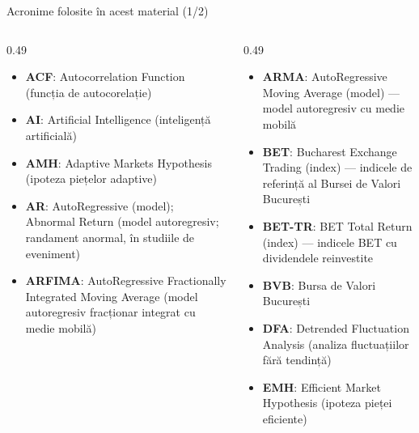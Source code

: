 \begin{frame}{Acronime folosite în acest material (1/2)}
\begin{columns}[T]
\begin{column}{0.49\textwidth}
\begin{itemize}\setlength{\itemsep}{0pt}
    \item \textbf{ACF}: Autocorrelation Function (funcția de autocorelație)
    \item \textbf{AI}: Artificial Intelligence (inteligență artificială)
    \item \textbf{AMH}: Adaptive Markets Hypothesis (ipoteza piețelor adaptive)
    \item \textbf{AR}: AutoRegressive (model); Abnormal Return (model autoregresiv; randament anormal, în studiile de eveniment)
    \item \textbf{ARFIMA}: AutoRegressive Fractionally Integrated Moving Average (model autoregresiv fracționar integrat cu medie mobilă)
\end{itemize}
\end{column}
\begin{column}{0.49\textwidth}
\begin{itemize}\setlength{\itemsep}{0pt}
    \item \textbf{ARMA}: AutoRegressive Moving Average (model) — model autoregresiv cu medie mobilă
    \item \textbf{BET}: Bucharest Exchange Trading (index) — indicele de referință al Bursei de Valori București
    \item \textbf{BET-TR}: BET Total Return (index) — indicele BET cu dividendele reinvestite
    \item \textbf{BVB}: Bursa de Valori București
    \item \textbf{DFA}: Detrended Fluctuation Analysis (analiza fluctuațiilor fără tendință)
    \item \textbf{EMH}: Efficient Market Hypothesis (ipoteza pieței eficiente)
\end{itemize}
\end{column}
\end{columns}
\end{frame}
